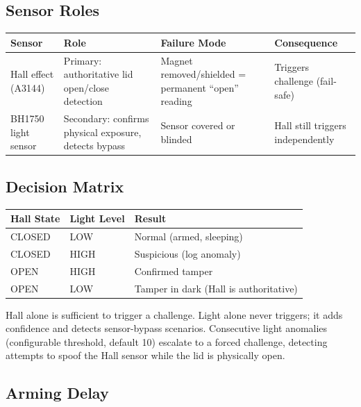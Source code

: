 \documentclass[11pt,letterpaper]{article}
\begin{document}
\subsection{Sensor Roles}

{\centering\begin{tabularx}{\textwidth}{L{3.2cm} Y Y L{3.6cm}}
\toprule
\textbf{Sensor} & \textbf{Role} & \textbf{Failure Mode} & \textbf{Consequence} \\
\midrule
Hall effect (A3144) & Primary: authoritative lid open/close detection & Magnet removed/shielded = permanent ``open'' reading & Triggers challenge (fail-safe) \\
BH1750 light sensor & Secondary: confirms physical exposure, detects bypass & Sensor covered or blinded & Hall still triggers independently \\
\bottomrule
\end{tabularx}\par}

\subsection{Decision Matrix}

{\centering
\begin{tabularx}{0.8\textwidth}{L{3cm} L{3cm} Y}
\toprule
\textbf{Hall State} & \textbf{Light Level} & \textbf{Result} \\
\midrule
{} CLOSED & LOW & Normal (armed, sleeping) \\
 CLOSED & HIGH & Suspicious (log anomaly) \\
 OPEN & HIGH & Confirmed tamper \\
 OPEN & LOW & Tamper in dark (Hall is authoritative) \\
\bottomrule
\end{tabularx}\par}

\begin{keybox}
Hall alone is sufficient to trigger a challenge. Light alone never triggers; it adds confidence and detects sensor-bypass scenarios. Consecutive light anomalies (configurable threshold, default 10) escalate to a forced challenge, detecting attempts to spoof the Hall sensor while the lid is physically open.
\end{keybox}

\subsection{Arming Delay}
\end{document}
